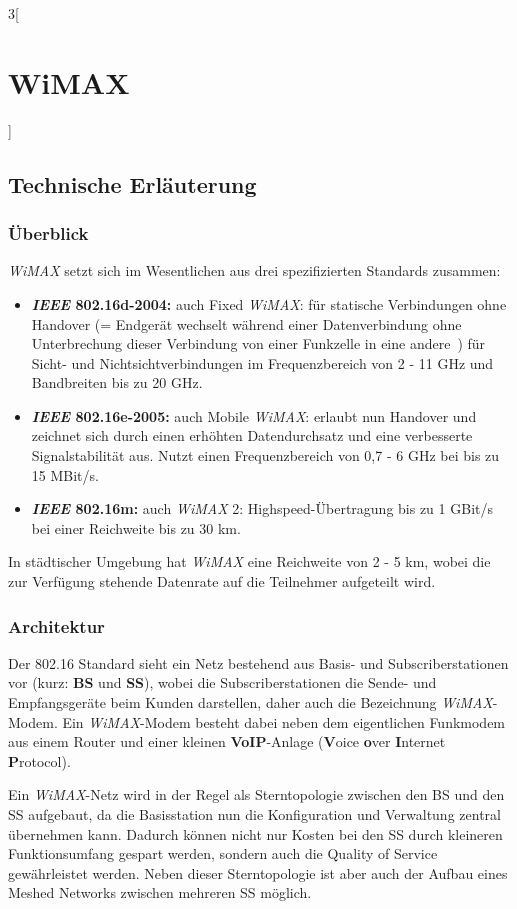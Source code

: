 \begin{multicols}{3}[\section{WiMAX}]
\subsection*{Technische Erläuterung}
\subsubsection*{Überblick}
\textit{WiMAX} setzt sich im Wesentlichen aus drei spezifizierten Standards zusammen:
\begin{itemize}
	\item \textbf{\textit{IEEE} 802.16d-2004:} auch Fixed \textit{WiMAX}: für statische Verbindungen ohne Handover (= Endgerät wechselt während einer Datenverbindung ohne Unterbrechung dieser Verbindung von einer Funkzelle in eine andere~\cite{wmx.10}) für Sicht- und Nichtsichtverbindungen im Frequenzbereich von 2 - 11 GHz und Bandbreiten bis zu 20 GHz.
	\item \textbf{\textit{IEEE} 802.16e-2005:} auch Mobile \textit{WiMAX}: erlaubt nun Handover und zeichnet sich durch einen erhöhten Datendurchsatz  und eine verbesserte Signalstabilität aus. Nutzt einen Frequenzbereich von 0,7 - 6 GHz bei bis zu 15 MBit/s.
	\item \textbf{\textit{IEEE} 802.16m:} auch \textit{WiMAX} 2: Highspeed-Übertragung bis zu 1 GBit/s bei einer Reichweite bis zu 30 km.
\end{itemize}
In städtischer Umgebung hat \textit{WiMAX} eine Reichweite von 2 - 5 km, wobei die zur Verfügung stehende Datenrate auf die Teilnehmer aufgeteilt wird.~\cite{wmx.4}

\subsubsection*{Architektur}
Der 802.16 Standard sieht ein Netz bestehend aus Basis- und Subscriberstationen vor (kurz: \textbf{BS} und \textbf{SS}), wobei die Subscriberstationen die Sende- und Empfangsgeräte beim Kunden darstellen, daher auch die Bezeichnung \textit{WiMAX}-Modem. Ein \textit{WiMAX}-Modem besteht dabei neben dem eigentlichen Funkmodem aus einem Router und einer kleinen \textbf{VoIP}-Anlage (\textbf{V}oice \textbf{o}ver \textbf{I}nternet \textbf{P}rotocol).

Ein \textit{WiMAX}-Netz wird in der Regel als Sterntopologie zwischen den BS und den SS aufgebaut, da die Basisstation nun die Konfiguration und Verwaltung zentral übernehmen kann. Dadurch können nicht nur Kosten bei den SS durch kleineren Funktionsumfang gespart werden, sondern auch die Quality of Service gewährleistet werden. Neben dieser Sterntopologie ist aber auch der Aufbau eines Meshed Networks zwischen mehreren SS möglich.


\end{multicols}
